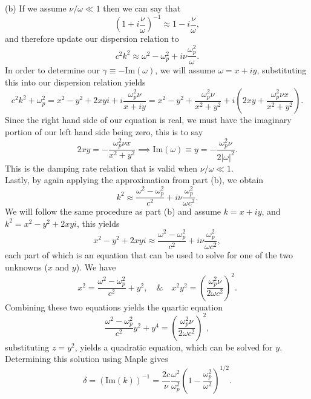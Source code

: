 (b) If we assume \(\nu/\omega \ll 1 \) then we can say that 
\begin{equation*}
	\left(1 + i\dfrac{\nu}{\omega} \right)^{-1} \approx 1 - i\dfrac{\nu}{\omega},
\end{equation*}
and therefore update our dispersion relation to 
\begin{equation*}
	c^2k^2 \approx \omega^2 - \omega_p^2 + i\nu\dfrac{\omega^2_p}{\omega}.
\end{equation*}
In order to determine our \(\gamma \equiv -\text{Im}(\omega) \), we will assume \(\omega = x + iy \), substituting this into our dispersion relation yields
\begin{equation*}
	c^2k^2 + \omega_p^2 = x^2 - y^2 + 2xyi + i\dfrac{\omega^2_p\nu}{x+iy} = x^2 - y^2 + \dfrac{\omega_p^2\nu}{x^2+y^2} + i\left(2xy + \dfrac{\omega_p^2\nu x}{x^2+y^2} \right).
\end{equation*}
Since the right hand side of our equation is real, we must have the imaginary portion of our left hand side being zero, this is to say
\begin{equation*}
	2xy =- \dfrac{\omega_p^2\nu x}{x^2+y^2} \implies  \text{Im}(\omega) \equiv y = - \dfrac{\omega_p^2\nu}{2|\omega|^2}.
\end{equation*}
This is the damping rate relation that is valid when \(\nu/\omega \ll 1 \).\\

Lastly, by again applying the approximation from part (b), we obtain
\begin{equation*}
	k^2 \approx \dfrac{\omega^2 - \omega_p^2}{c^2} + i\nu\dfrac{\omega^2_p}{\omega c^2}.
\end{equation*}
We will follow the same procedure as part (b) and assume \(k = x + iy \), and \(k^2 = x^2 - y^2 + 2xyi \), this yields 
\begin{equation*}
	x^2 - y^2 + 2xyi \approx \dfrac{\omega^2 - \omega^2_p}{c^2} + i\nu\dfrac{\omega^2_p}{\omega c^2},
\end{equation*}
each part of which is an equation that can be used to solve for one of the two unknowns (\(x\) and \(y\)). We have
\begin{equation*}
	x^2 = \dfrac{\omega^2 - \omega^2_p}{c^2} + y^2, \quad \& \quad x^2y^2 = \left(\dfrac{\omega^2_p\nu}{2\omega c^2}\right)^2.
\end{equation*}
Combining these two equations yields the quartic equation
\begin{equation*}
	\dfrac{\omega^2 - \omega^2_p}{c^2}y^2 + y^4 = \left(\dfrac{\omega^2_p\nu}{2\omega c^2}\right)^2,
\end{equation*}
substituting \(z = y^2\), yields a quadratic equation, which can be solved for \(y\). Determining this solution using Maple gives
\begin{equation*}
	\delta = \left(\text{Im}(k)\right)^{-1} = \dfrac{2c}{\nu}\dfrac{\omega^2}{\omega_p^2}\left(1 - \dfrac{\omega^2_p}{\omega^2}\right)^{1/2}.
\end{equation*}


